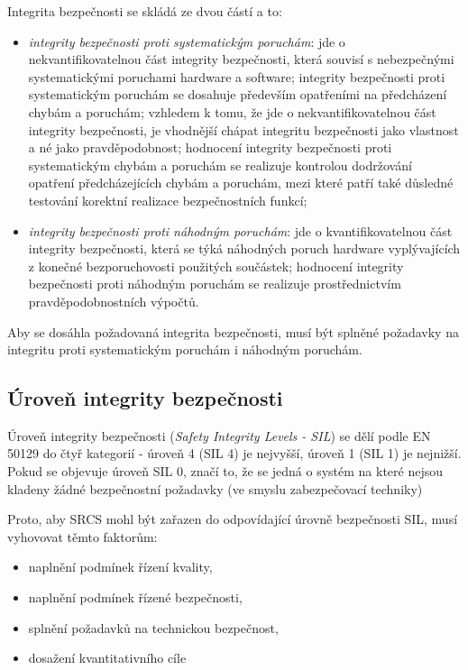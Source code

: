     Integrita bezpečnosti se skládá ze dvou částí a to:
    \begin{itemize}
      \item \emph{integrity bezpečnosti proti systematickým poruchám}: jde o nekvantifikovatelnou
            část integrity bezpečnosti, která souvisí s nebezpečnými systematickými poruchami 
            hardware a software; integrity bezpečnosti proti systematickým poruchám se dosahuje
            především opatřeními na předcházení chybám a poruchám; vzhledem k tomu, že jde o 
            nekvantifikovatelnou část integrity bezpečnosti, je vhodnější chápat integritu 
            bezpečnosti jako vlastnost a né jako pravděpodobnost; hodnocení integrity bezpečnosti
            proti systematickým chybám a poruchám se realizuje kontrolou dodržování opatření
            předcházejících chybám a poruchám, mezi které patří také důsledné testování korektní
            realizace bezpečnostních funkcí; 
      \item \emph{integrity bezpečnosti proti náhodným poruchám}: jde o kvantifikovatelnou část
            integrity bezpečnosti, která se týká náhodných poruch hardware vyplývajících z konečné bezporuchovosti použitých součástek; hodnocení integrity bezpečnosti proti náhodným poruchám se realizuje prostřednictvím pravděpodobnostních výpočtů.         
    \end{itemize}
    
    Aby se dosáhla požadovaná integrita bezpečnosti, musí být splněné požadavky na integritu proti 
    systematickým poruchám i náhodným poruchám. 
    
    \subsection{Úroveň integrity bezpečnosti}
      Úroveň integrity bezpečnosti (\emph{Safety Integrity Levels - SIL}) se dělí podle EN 50129
      do čtyř kategorií - úroveň 4 (SIL 4) je nejvyšší, úroveň 1 (SIL 1) je nejnižší.  Pokud se
      objevuje úroveň SIL 0, značí to, že se jedná o systém na které nejsou kladeny žádné
      bezpečnostní požadavky (ve smyslu zabezpečovací techniky)
      
      Proto, aby SRCS mohl být zařazen do odpovídající úrovně bezpečnosti SIL, musí vyhovovat
      těmto faktorům:
      \begin{itemize}
        \item naplnění podmínek řízení kvality, 
        \item naplnění podmínek řízené bezpečnosti,
        \item splnění požadavků na technickou bezpečnost, 
        \item dosažení kvantitativního cíle
      \end{itemize}
      
